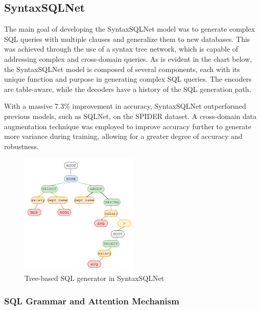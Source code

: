\subsection{SyntaxSQLNet}

The main goal of developing the SyntaxSQLNet model\cite{DBLP:journals/corr/abs-1810-05237} was to generate complex SQL queries with multiple clauses and generalize them to new databases.
This was achieved through the use of a syntax tree network, which is capable of addressing complex and cross-domain queries.
As is evident in the chart below, the SyntaxSQLNet model is composed of several components, each with its unique function and purpose in generating complex SQL queries. The encoders are table-aware, while the decoders have a history of the SQL generation path.

With a massive 7.3\% improvement in accuracy, SyntaxSQLNet outperformed previous models, such as SQLNet, on the SPIDER dataset.
A cross-domain data augmentation technique was employed to improve accuracy further to generate more variance during training, allowing for a greater degree of accuracy and robustness.

\begin{figure}[H]
    \centering
    \includegraphics[width=0.5\textwidth]{pics/SyntaxSQLNet/Tree-based.png}
    \caption{Tree-based SQL generator in SyntaxSQLNet\cite{DBLP:journals/corr/abs-1810-05237}}
    \label{fig:tree-based}
\end{figure}


\subsubsection*{SQL Grammar and Attention Mechanism}

